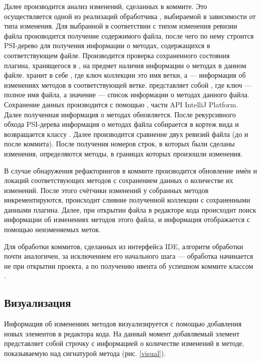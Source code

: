 \documentclass[14pt]{matmex-diploma-custom}
\begin{document}
Далее производится анализ изменений, сделанных в коммите. Это осуществляется одной из реализаций обработчика , выбираемой в зависимости от типа изменения. Для выбранной в соответствии с типом изменения ревизии файла производится получение содержимого файла, после чего по нему строится PSI-дерево для получения информации о методах, содержащихся в соответствующем файле. Производится проверка сохраненного состояния плагина, хранящегося в , на предмет наличия информации о методах в данном файле.  хранит в себе , где ключ коллекции это имя ветки, а  --- информация об изменениях методов в соответствующей ветке.  представляет собой , где ключ --- полное имя файла, а значение --- список информации  о методах данного файла. Сохранение данных производится с помощью  \cite{pstate}, части API IntelliJ Platform. Далее полученная информация о методах обновляется. После рекурсивного обхода PSI-дерева информация о методах файла собирается в кортеж вида  и возвращается классу . Далее производится сравнение двух ревизий файла (до и после коммита). После получения номеров строк, в которых были сделаны изменения, определяются методы, в границах которых произошли изменения.

В случае обнаружения рефакторингов в коммите производится обновление имён и локаций соответствующих методов с сохранением данных о количестве их изменений. После этого счётчики изменений у собранных методов инкрементируются, происходит слияние полученной коллекции с сохраненными данными плагина. Далее, при открытии файла в редакторе кода происходит поиск информации об изменениях методов этого файла, и информация отображается с помощью неизменяемых меток. 

Для обработки коммитов, сделанных из интерфейса IDE, алгоритм обработки почти аналогичен, за исключением его начального шага --- обработка начинается не при открытии проекта, а по получению ивента об успешном коммите классом .



\subsection{Визуализация}
Информация об изменениях методов визуализируется с помощью добавления новых элементов в  редактора кода. На данный момент добавляемый элемент представляет собой строчку с информацией о количестве изменений в методе, показываемую над сигнатурой метода (рис. \ref{visual}).
\end{document}
